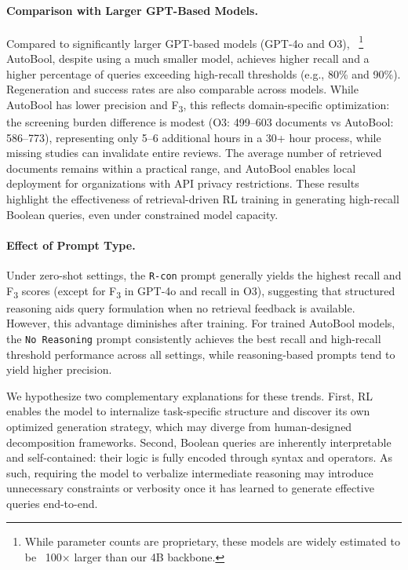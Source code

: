 \paragraph{Comparison with Larger GPT-Based Models.}
Compared to significantly larger GPT-based models (GPT-4o and O3),%
~\footnote{While parameter counts are proprietary, these models are widely estimated to be ~100× larger than our 4B backbone.}
AutoBool, despite using a much smaller model, achieves higher recall and a higher percentage of queries exceeding high-recall thresholds (e.g., 80\% and 90\%). Regeneration and success rates are also comparable across models. While AutoBool has lower precision and F\textsubscript{3}, this reflects domain-specific optimization: the screening burden difference is modest (O3: 499--603 documents vs AutoBool: 586--773), representing only 5–6 additional hours in a 30+ hour process, while missing studies can invalidate entire reviews. The average number of retrieved documents remains within a practical range, and AutoBool enables local deployment for organizations with API privacy restrictions. These results highlight the effectiveness of retrieval-driven RL training in generating high-recall Boolean queries, even under constrained model capacity.


\paragraph{Effect of Prompt Type.}
Under zero-shot settings, the \texttt{R-con} prompt generally yields the highest recall and F\textsubscript{3} scores (except for F\textsubscript{3} in GPT-4o and recall in O3), suggesting that structured reasoning aids query formulation when no retrieval feedback is available. However, this advantage diminishes after training. For trained AutoBool models, the \texttt{No Reasoning} prompt consistently achieves the best recall and high-recall threshold performance across all settings, while reasoning-based prompts tend to yield higher precision.

We hypothesize two complementary explanations for these trends. First, RL enables the model to internalize task-specific structure and discover its own optimized generation strategy, which may diverge from human-designed decomposition frameworks. Second, Boolean queries are inherently interpretable and self-contained: their logic is fully encoded through syntax and operators. As such, requiring the model to verbalize intermediate reasoning may introduce unnecessary constraints or verbosity once it has learned to generate effective queries end-to-end.

